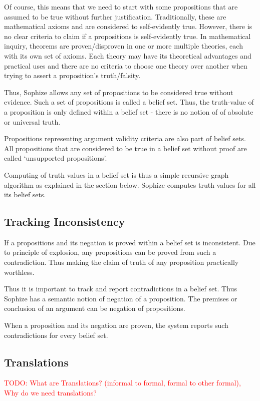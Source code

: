 \documentclass[a4paper]{article}
\newcommand\todo[1]{\textcolor{red}{TODO: #1}}
\begin{document}
Of course, this means that we need to start with some propositions that are assumed to be true without further justification. Traditionally, these are mathematical axioms and are considered to self-evidently true. However, there is no clear criteria to claim if a propositions is self-evidently true. In mathematical inquiry, theorems are proven/disproven in one or more multiple theories, each with its own set of axioms. Each theory may have its theoretical advantages and practical uses and there are no criteria to choose one theory over another when trying to assert a proposition's truth/falsity.

Thus, Sophize allows any set of propositions to be considered true without evidence. Such a set of propositions is called a belief set. Thus, the truth-value of a proposition is only defined within a belief set - there is no notion of of absolute or universal truth. 

Propositions representing argument validity criteria are also part of belief sets. All propositions that are considered to be true in a belief set without proof are called `unsupported propositions'.

Computing of truth values in a belief set is thus a simple recursive graph algorithm as explained in the section below. Sophize computes truth values for all its belief sets.

\subsection{Tracking Inconsistency}
If a propositions and its negation is proved within a belief set is inconsistent. Due to principle of explosion, any propositions can be proved from such a contradiction. Thus making the claim of truth of any proposition practically worthless.

Thus it is important to track and report contradictions in a belief set. Thus Sophize has a semantic notion of negation of a proposition. The premises or conclusion of an argument can be negation of propositions.

When a proposition and its negation are proven, the system reports such contradictions for every belief set.

\subsection{Translations}
\todo{What are Translations? (informal to formal, formal to other formal), Why do we need translations?}
\end{document}
